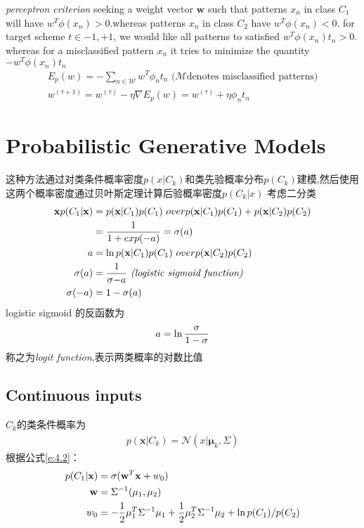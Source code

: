\documentclass[a4paper]{article}
\begin{document}
\textit{perceptron criterion}
seeking a weight vector $\mathbf{w}$ such that patterns $x_n$ in class $C_1$
 will have $w^T \phi(x_n) > 0$.whereas patterns $x_n$ in class $C_2$
 have $w^T \phi(x_n) < 0$. for target scheme $t \in {-1, +1}$, we would like all
 patterns to satisfied $w^T \phi(x_n)t_n > 0$. whereas for a misclassified
 pattern $x_n$ it tries to minimize the quantity $ - w^T \phi(x_n)t_n$
\begin{align}
E_p(w) = - \sum_{n \in \mathcal{W}}w^T \phi_n t_n  \text{   ($\mathcal{M}$
  denotes misclassified patterns)}
\\
w^{(\tau+1)} = w^{(\tau)} - \eta \nabla E_p(w) = w^{(\tau)} + \eta
  \phi_n t_n
\end{align}

\section{Probabilistic Generative Models}
\label{sec:4.2}
这种方法通过对类条件概率密度$p(x|C_k)$和类先验概率分布$p(C_k)$建模,然后使用这两个概率密度通过贝叶斯定理计算后验概率密度$p(C_k |x)$
考虑二分类
\begin{align*}
\label{e:4.2}
\mathbf{x}
p(C_1|\mathbf{x}) &= {p(\mathbf{x}|C_1)p(C_1) \ over p(\mathbf{x}|C_1)p(C_1) + p(\mathbf{x}|C_2)p(C_2)} \\
&= {1 \over 1+exp(-a)} = \sigma(a)\\
a &= \ln {p(\mathbf{x}|C_1)p(C_1) \ over  p(\mathbf{x}|C_2)p(C_2)}\\
\sigma(a) &= {1 \over \sigma{-a}} \textit{ (logistic sigmoid function)}\\
\sigma(-a) &= 1 - \sigma(a)
\end{align*}
logistic sigmoid 的反函数为
\begin{align}
  a = \ln {\sigma \over 1-\sigma}
\end{align}
称之为\emph{logit function},表示两类概率的对数比值

\subsection{Continuous inputs}
\label{sec:4.2.1}
$C_k$的类条件概率为
\begin{align*}
p(\mathbf{x}|C_k) = \mathcal{N}(x|\boldsymbol{\mu}_k, \Sigma)
\end{align*}
根据公式\ref{e:4.2}：
\begin{align*}
p(C_1|\mathbf{x}) &= \sigma(\mathbf{w}^T \mathbf{x} + w_0)\\
\mathbf{w} &= \Sigma^{-1} (\mu_1, \mu_2)\\
w_0 &= -{1 \over 2} \mu_1^T \Sigma^{-1}\mu_1 + {1 \over 2} \mu_2^T \Sigma^{-1}\mu_2 + \ln {p(C_1)/p(C_2)}
\end{align*}
\end{document}
